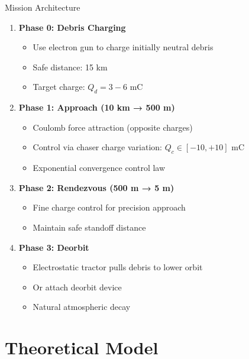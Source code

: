 \documentclass[aspectratio=169]{beamer}
\begin{document}
\begin{frame}{Mission Architecture}
\begin{enumerate}
    \item \textbf{Phase 0: Debris Charging}
    \begin{itemize}
        \item Use electron gun to charge initially neutral debris
        \item Safe distance: 15 km
        \item Target charge: $Q_d = 3-6$ mC
    \end{itemize}

    \item \textbf{Phase 1: Approach (10 km → 500 m)}
    \begin{itemize}
        \item Coulomb force attraction (opposite charges)
        \item Control via chaser charge variation: $Q_c \in [-10, +10]$ mC
        \item Exponential convergence control law
    \end{itemize}

    \item \textbf{Phase 2: Rendezvous (500 m → 5 m)}
    \begin{itemize}
        \item Fine charge control for precision approach
        \item Maintain safe standoff distance
    \end{itemize}

    \item \textbf{Phase 3: Deorbit}
    \begin{itemize}
        \item Electrostatic tractor pulls debris to lower orbit
        \item Or attach deorbit device
        \item Natural atmospheric decay
    \end{itemize}
\end{enumerate}
\end{frame}

\section{Theoretical Model}
\end{document}
